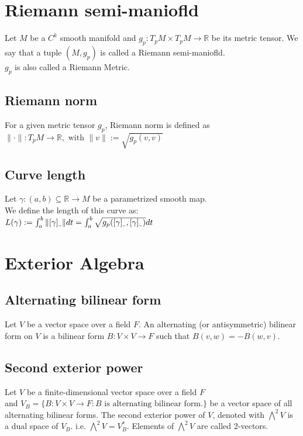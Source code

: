 \documentclass[a4paper, 11pt]{article}
\newcommand{\Real}{\mathbb{R}}
\theoremstyle{definition}
\begin{document}
\section{Riemann semi-maniofld}
Let $M$ be a $C^k$ smooth manifold and $g_p: T_pM \times T_pM \rightarrow \Real$ be its metric tensor. We say that a tuple $(M, g_p)$ is called a Riemann semi-maniofld. \\
$g_p$ is also called a Riemann Metric.

\subsection{Riemann norm}
For a given metric tensor $g_p$, Riemann norm is defined as $\|\cdot\|: T_pM \rightarrow \Real, \text{ with } \|v\| := \sqrt{g_p(v, v)}$

\subsection{Curve length}
Let $\gamma: (a, b) \subseteq \Real \rightarrow M$ be a parametrized smooth map. \\
We define the length of this curve as: \\
$L(\gamma) := \int_a^b \|[\gamma]_\text{\texttildelow}\| dt = \int_a^b \sqrt{g_p([\gamma]_\text{\texttildelow}, [\gamma]_\text{\texttildelow})} dt$


\section{Exterior Algebra}
\subsection{Alternating bilinear form}
Let $V$ be a vector space over a field $F$. An alternating (or antisymmetric) bilinear form on $V$ is a bilinear form $B: V \times V \rightarrow F$ such that $B(v, w) = -B(w, v)$.

\subsection{Second exterior power}
Let $V$ be a finite-dimensional vector space over a field $F$ \\
and $V_B = \{ B: V \times V \rightarrow F : B \text{ is alternating bilinear form.} \}$ be a vector space of all alternating bilinear forms.
The second exterior power of $V$, denoted with $\bigwedge\nolimits^2 V$ is a dual space of $V_B$. i.e. $\bigwedge\nolimits^2 V = V_B^*$. Elements of $\bigwedge\nolimits^2 V$ are called 2-vectors.
\end{document}
